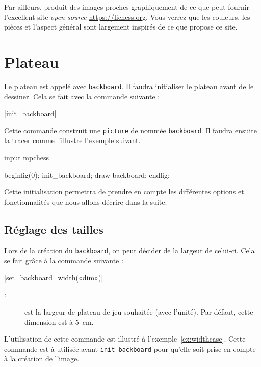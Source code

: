 \documentclass[french]{ltxdoc}
\begin{document}
Par ailleurs, \mpchess produit des images proches graphiquement de ce que peut
fournir l’excellent site \emph{open source} \url{https://lichess.org}. Vous
verrez que les couleurs, les pièces et l’aspect général sont largement inspirés
de ce que propose ce site.

\section{Plateau}

Le plateau est appelé avec \mpchess{} \lstinline+backboard+.
Il faudra initialiser le plateau avant de le dessiner. Cela se fait avec la
commande suivante :\par

\commande|init_backboard|\smallskip{}


Cette commande construit une \lstinline+picture+ de \MP{} nommée
\mbox{\lstinline+backboard+.} Il faudra ensuite la tracer comme l’illustre l’exemple
suivant.

\begin{ExempleMP}
input mpchess

beginfig(0);
init_backboard;
draw backboard;
endfig;
\end{ExempleMP}

Cette initialisation permettra de prendre en compte les différentes options et
fonctionnalités que nous allons décrire dans la suite.
\subsection{Réglage des tailles}
Lors de la création du \lstinline+backboard+, on peut décider de la largeur de celui-ci. Cela se fait grâce à la commande suivante :\par\bigskip

\commande|set_backboard_width(«dim»)|\smallskip{}

\begin{description}
  \item[:] est la largeur de plateau de jeu souhaitée (avec l’unité). Par défaut, cette dimension est à \SI{5}{cm}.
\end{description}

L’utilisation de cette commande est illustré à l’exemple~\ref{ex:widthcase}. Cette commande est à utilisée avant \lstinline+init_backboard+ pour qu’elle soit prise en compte à la création de l’image.
\bigskip
\end{document}
